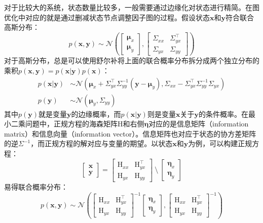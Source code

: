 对于比较大的系统，状态数量比较多，一般需要通过边缘化对状态进行精简。在图优化中对应的就是通过删减状态节点调整因子图的过程。假设状态$\bm{x}$和$\bm{y}$符合联合高斯分布：
\begin{equation}
p(\bm{x},\bm{y}) \sim \mathcal{N}
\left(
    \begin{bmatrix} \bm{\mu}_x \\ \bm{\mu}_y \end{bmatrix},
    \begin{bmatrix}
        \Sigma_{xx} & \Sigma_{yx}^\top \\
        \Sigma_{yx} & \Sigma_{yy}
    \end{bmatrix}
    \label{eq:joint}
\right)
\end{equation}
对于高斯分布，总是可以使用舒尔补将上面的联合概率分布拆分成两个独立分布的乘积$p(\bm{x},\bm{y})=p(\bm{x}|\bm{y})p(\bm{x})$：
\begin{equation}
\begin{aligned}
    p(\bm{x}|\bm{y}) &\sim \mathcal{N}(
        \bm{\mu}_x+\Sigma_{yx}^\top\Sigma_{yy}^{-1}(\bm{y}-\bm{\mu}_y),
        \Sigma_{xx}-\Sigma_{yx}^\top\Sigma_{yy}^{-1}\Sigma_{yx}) \\
    p(\bm{y}) &\sim \mathcal{N}(\bm{\mu}_y,\Sigma_{yy})
\end{aligned}
\label{eq:indep}
\end{equation}
其中$p(\bm{y})$就是变量$\bm{y}$的边缘概率，而$p(\bm{x}|\bm{y})$则是变量$\bm{x}$关于$\bm{y}$的条件概率。在最小二乘问题中，正规方程的海森矩阵$\mathrm{H}$和右侧$\bm{\eta}$对应的是信息矩阵（information matrix）和信息向量（information vector）\citep{barfoot2017state}。信息矩阵也对应于状态的协方差矩阵的逆$\Sigma^{-1}$，而正规方程的解对应与变量的期望。以状态$\bm{x}$和$\bm{y}$为例，可以构建正规方程：
\begin{equation}
\begin{bmatrix} \bm{x} \\ \bm{y} \end{bmatrix} =
\begin{bmatrix}
    \mathrm{H}_{xx} & \mathrm{H}_{yx}^\top \\
    \mathrm{H}_{yx} & \mathrm{H}_{yy}
\end{bmatrix} \:\setminus\:
\begin{bmatrix} \bm{\eta}_x \\ \bm{\eta}_y \end{bmatrix}
\end{equation}
易得联合概率分布：
\begin{equation}
p(\bm{x},\bm{y}) \sim \mathcal{N}
\left(
\begin{bmatrix}
    \mathrm{H}_{xx} & \mathrm{H}_{yx}^\top \\
    \mathrm{H}_{yx} & \mathrm{H}_{yy}
\end{bmatrix}^{-1}
\begin{bmatrix} \bm{\eta}_x \\ \bm{\eta}_y \end{bmatrix},
\begin{bmatrix}
    \mathrm{H}_{xx} & \mathrm{H}_{yx}^\top \\
    \mathrm{H}_{yx} & \mathrm{H}_{yy}
\end{bmatrix}^{-1}
\right)
\end{equation}
